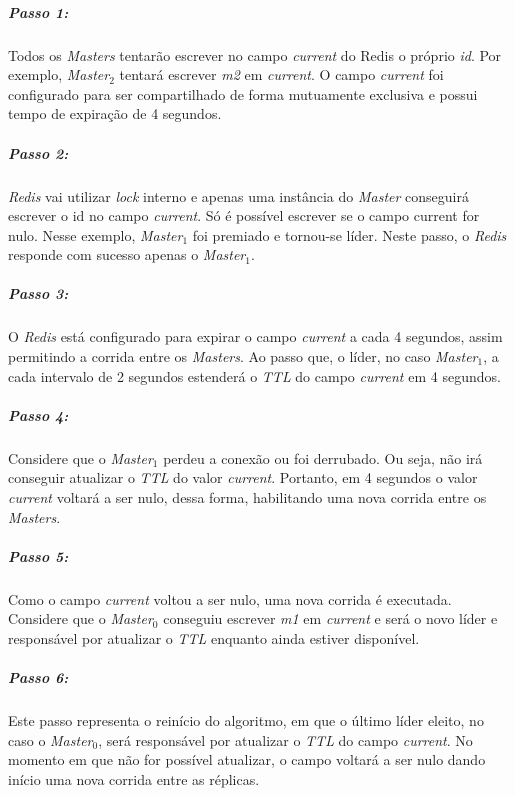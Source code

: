 \subparagraph{Passo 1:} Todos os \textit{Masters} tentarão escrever no campo \textit{current} do Redis o próprio \textit{id}. Por exemplo, \textit{Master$_2$} tentará escrever \textit{m2} em \textit{current}. O campo \textit{current} foi configurado para ser compartilhado de forma mutuamente exclusiva e possui tempo de expiração de 4 segundos.

\subparagraph{Passo 2:} \textit{Redis} vai utilizar \textit{lock} interno e apenas uma instância do \textit{Master} conseguirá escrever o id no campo \textit{current}. Só é possível escrever se o campo current for nulo. Nesse exemplo, \textit{Master$_1$} foi premiado e tornou-se líder. Neste passo, o \textit{Redis} responde com sucesso apenas o \textit{Master$_1$}.

\subparagraph{Passo 3:} O \textit{Redis} está configurado para expirar o campo \textit{current} a cada 4 segundos, assim permitindo a corrida entre os \textit{Masters}.
Ao passo que, o líder, no caso \textit{Master$_1$}, a cada intervalo de 2 segundos estenderá o \textit{TTL} do campo \textit{current} em 4 segundos.

\subparagraph{Passo 4:} Considere que o \textit{Master$_1$} perdeu a conexão ou foi derrubado. Ou seja, não irá conseguir atualizar o \textit{TTL} do valor \textit{current}. Portanto, em 4 segundos o valor \textit{current} voltará a ser nulo, dessa forma, habilitando uma nova corrida entre os \textit{Masters}.

\subparagraph{Passo 5:} Como o campo \textit{current} voltou a ser nulo, uma nova corrida é executada. Considere que o \textit{Master$_0$} conseguiu escrever \textit{m1} em \textit{current} e será o novo líder e responsável por atualizar o \textit{TTL} enquanto ainda estiver disponível.

\subparagraph{Passo 6:} Este passo representa o reinício do algoritmo, em que o último líder eleito, no caso o \textit{Master$_0$}, será responsável por atualizar o \textit{TTL} do campo \textit{current}. No momento em que não for possível atualizar, o campo voltará a ser nulo dando início uma nova corrida entre as réplicas.


